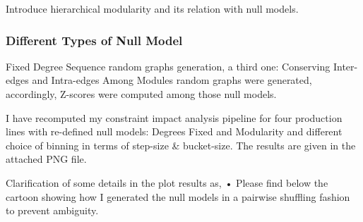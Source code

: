 Introduce hierarchical modularity and its relation with null models.

\subsubsection*{Different Types of Null Model}
Fixed Degree Sequence random graphs generation, a third one: Conserving Inter-edges and Intra-edges Among Modules random graphs were generated, accordingly, Z-scores were computed among those null models.

I have recomputed my constraint impact analysis pipeline for four production lines with re-defined null models: Degrees Fixed and Modularity and different choice of binning in terms of step-size \& bucket-size. The results are given in the attached PNG file.

Clarification of some details in the plot results as,
•	Please find below the cartoon showing how I generated the null models in a pairwise shuffling fashion to prevent ambiguity.


\clearpage